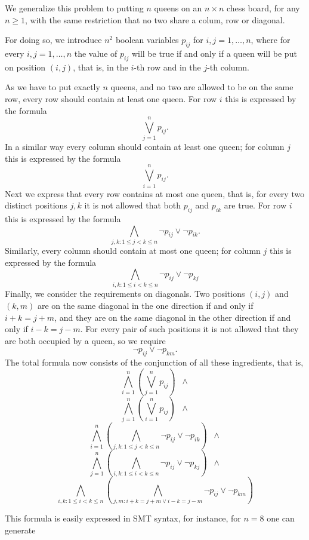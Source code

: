 \documentclass[12pt]{article}
\begin{document}
We generalize this problem to putting $n$ queens on an $n \times n$
chess board, for any $n \geq 1$, with the same restriction that no 
two share a colum, row or diagonal.

For doing so, we introduce $n^2$  
 boolean variables $p_{ij}$ for $i,j = 1,\ldots,n$, where for 
every $i,j = 1,\ldots,n$ the value of $p_{ij}$ will be true if and
only if a queen will be put on position $(i,j)$, that is, in the
$i$-th row and in the $j$-th column.

As we have to put exactly $n$ queens, and no two are allowed to be
on the same row, every row should contain at least one queen. For
row $i$ this is expressed by the formula
\[ \bigvee_{j=1}^n p_{ij}.\]
In a similar way every column should contain at least one queen;
for column $j$ this is expressed by the formula 
\[ \bigvee_{i=1}^n p_{ij}.\]
Next we express that every row contains at most one queen, that
is, for every two distinct positions $j,k$ it is not allowed that
both $p_{ij}$ and $p_{ik}$ are true. For row $i$ this is expressed
by the formula
\[ \bigwedge_{j,k:1 \leq j < k \leq n} \neg p_{ij} \vee \neg p_{ik}.\]
Similarly, every column should contain at most one queen;
for column $j$ this is expressed by the formula 
\[ \bigwedge_{i,k:1 \leq i < k \leq n} \neg p_{ij} \vee \neg p_{kj} \]
Finally, we consider the requirements on diagonals. Two positions
$(i,j)$ and $(k,m)$ are on the same diagonal in the one direction
if and only if $i+k = j+m$, and they are on the same diagonal in 
the other direction if and only if $i-k = j-m$. For every pair of
such positions it is not allowed that they are both occupied by a
queen, so we require
\[ \neg p_{ij} \vee \neg p_{km}.\]
The total formula now consists of the conjunction of all these
ingredients, that is, 
\[ \bigwedge_{i=1}^n (\bigvee_{j=1}^n p_{ij}) \;\; \wedge \]
\[ \bigwedge_{j=1}^n (\bigvee_{i=1}^n p_{ij}) \;\; \wedge \]
\[  \bigwedge_{i=1}^n (\bigwedge_{j,k:1 \leq j < k \leq n} \neg 
p_{ij} \vee \neg p_{ik}) \;\; \wedge \]
\[ \bigwedge_{j=1}^n ( \bigwedge_{i,k:1 \leq i < k \leq n} \neg p_{ij}
\vee \neg p_{kj}) \;\; \wedge \]
\[ \bigwedge_{i,k:1 \leq i < k \leq n} ( \bigwedge_{j,m: i+k = j+m \vee
i-k = j-m} \neg p_{ij} \vee \neg p_{km}) \]

This formula is easily expressed in SMT syntax, for instance, for
$n=8$ one can generate
\end{document}
